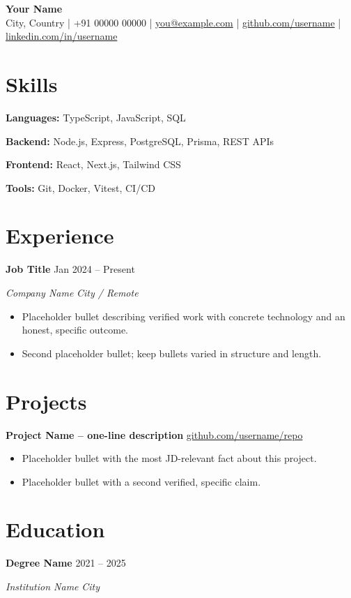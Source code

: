 \documentclass[letterpaper,10.5pt]{article}
\newcommand{\ResumeHeader}[2]{%
  \begin{center}
    {\Huge\bfseries #1}\\[5pt]
    {\small #2}%
  \end{center}\vspace{-6pt}}
\newcommand{\Entry}[4]{%
  \textbf{#1} \hfill {\small #2}\par
  \textit{\small #3} \hfill {\small\textit{#4}}\par\vspace{-1pt}}
\newcommand{\EntryLine}[2]{\textbf{#1} \hfill {\small #2}\par\vspace{-1pt}}
\newenvironment{Bullets}
  {\begin{itemize}[leftmargin=1.15em,itemsep=1.5pt,parsep=0pt,topsep=3pt]\small}
  {\end{itemize}\vspace{3pt}}
\newcommand{\SkillRow}[2]{{\small \textbf{#1:} #2}\par\vspace{1.5pt}}
\begin{document}
\ResumeHeader{Your Name}
  {City, Country \;|\; +91 00000 00000 \;|\;
   \href{mailto:you@example.com}{you@example.com} \;|\;
   \href{https://github.com/username}{github.com/username} \;|\;
   \href{https://linkedin.com/in/username}{linkedin.com/in/username}}

\section{Skills}
\SkillRow{Languages}{TypeScript, JavaScript, SQL}
\SkillRow{Backend}{Node.js, Express, PostgreSQL, Prisma, REST APIs}
\SkillRow{Frontend}{React, Next.js, Tailwind CSS}
\SkillRow{Tools}{Git, Docker, Vitest, CI/CD}

\section{Experience}
\Entry{Job Title}{Jan 2024 -- Present}{Company Name}{City / Remote}
\begin{Bullets}
  \item Placeholder bullet describing verified work with concrete technology and an honest, specific outcome.
  \item Second placeholder bullet; keep bullets varied in structure and length.
\end{Bullets}

\section{Projects}
\EntryLine{Project Name -- one-line description}{\href{https://github.com/username/repo}{github.com/username/repo}}
\begin{Bullets}
  \item Placeholder bullet with the most JD-relevant fact about this project.
  \item Placeholder bullet with a second verified, specific claim.
\end{Bullets}

\section{Education}
\Entry{Degree Name}{2021 -- 2025}{Institution Name}{City}
\end{document}
